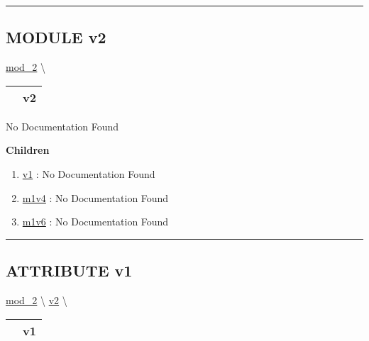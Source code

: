 \rule{\linewidth}{0.5pt}

\subsection*{\textsf{\colorbox{headtoc}{\color{white} MODULE}
v2}}

\hypertarget{ecldoc:mod_1}{}
\hspace{0pt} \hyperlink{ecldoc:mod_2}{mod_2} \textbackslash 

{\renewcommand{\arraystretch}{1.5}
\begin{tabularx}{\textwidth}{|>{\raggedright\arraybackslash}l|X|}
\hline
\hspace{0pt}\mytexttt{\color{red} } & \textbf{v2} \\
\hline
\end{tabularx}
}

\par





No Documentation Found







\textbf{Children}
\begin{enumerate}
\item \hyperlink{ecldoc:mod_1.v1}{v1}
: No Documentation Found
\item \hyperlink{ecldoc:mod_1.m1v4}{m1v4}
: No Documentation Found
\item \hyperlink{ecldoc:mod_1.m1v6}{m1v6}
: No Documentation Found
\end{enumerate}

\rule{\linewidth}{0.5pt}

\subsection*{\textsf{\colorbox{headtoc}{\color{white} ATTRIBUTE}
v1}}

\hypertarget{ecldoc:mod_1.v1}{}
\hspace{0pt} \hyperlink{ecldoc:mod_2}{mod_2} \textbackslash 
\hspace{0pt} \hyperlink{ecldoc:mod_1}{v2} \textbackslash 

{\renewcommand{\arraystretch}{1.5}
\begin{tabularx}{\textwidth}{|>{\raggedright\arraybackslash}l|X|}
\hline
\hspace{0pt}\mytexttt{\color{red} } & \textbf{v1} \\
\hline
\end{tabularx}
}

